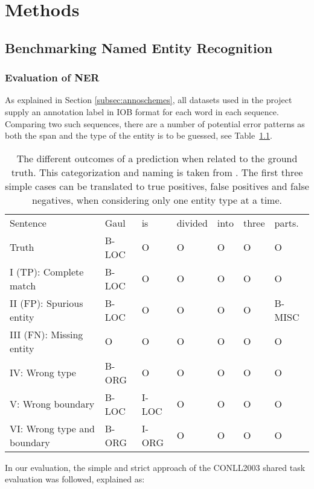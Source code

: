\documentclass[main.tex]{subfiles}
\begin{document}
\chapter{Methods}
\label{chap:methods}

\section{Benchmarking Named Entity Recognition}
\subsection{Evaluation of NER}
\label{subsec:nereval}
As explained in Section \ref{subsec:annoschemes}, all datasets used in the project supply an annotation label in IOB format \cite{ramshaw1995IOB} for each word in each sequence.
Comparing two such sequences, there are a number of potential error patterns as both the span and the type of the entity is to be guessed, see Table~\ref{tab:eval}.
\begin{table}[H]
    \footnotesize
    \centering
    \begin{tabular}{l|llllll}
        Sentence                    & Gaul & is & divided & into & three & parts.\\
        Truth                       & B-LOC & O & O & O & O & O \\\hline
        I (TP): Complete match      & B-LOC & O & O & O & O & O \\
        II (FP): Spurious entity    & B-LOC & O & O & O & O & B-MISC \\
        III (FN): Missing entity    & O     & O & O & O & O & O \\
        IV: Wrong type              & B-ORG & O & O & O & O & O \\
        V: Wrong boundary           & B-LOC & I-LOC & O & O & O & O \\
        VI: Wrong type and boundary & B-ORG & I-ORG & O & O & O & O
    \end{tabular}
    \caption{
        The different outcomes of a prediction when related to the ground truth.
        This categorization and naming is taken from \cite{batista2018eval}.
        The first three simple cases can be translated to true positives, false positives and false negatives, when considering only one entity type at a time.
    }
    \label{tab:eval}
\end{table}\noindent
In our evaluation, the simple and strict approach of the CONLL2003 shared task evaluation was followed, explained as:
\end{document}
